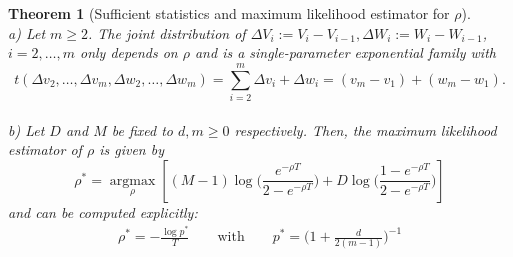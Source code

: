 \documentclass[preprint,authoryear]{elsarticle}
\newtheorem{theorem}{Theorem}
\theoremstyle{definition}
\numberwithin{equation}{section}
\numberwithin{figure}{section}
\begin{document}
\begin{theorem}[Sufficient statistics and maximum likelihood estimator for $\rho$\label{T:suff}]
  \quad \\ a) Let $m\geq 2$. The joint distribution of
  $\Delta V_i := V_i-V_{i-1}, \Delta W_i := W_i - W_{i-1}$,
  $i=2,\dots,m$ only depends on $\rho$ and is a single-parameter
  exponential family with
  $$ t(\Delta v_2,\dots,\Delta v_m, \Delta w_2,\dots,\Delta w_m) = 
  \sum_{i=2}^m \Delta v_i + \Delta w_i = (v_m-v_1) + (w_m-w_1).$$
  \\
  b)
  Let $D$ and $M$ be fixed to $d,m \geq 0$ respectively.
  Then, the maximum likelihood estimator of $\rho$ is given by 
  \begin{equation}\label{eq:totalprob2}
    \rho^\ast 
    = \mathop{argmax}\limits_{\rho} \left[(M-1)\log\bigg(\frac{e^{-\rho T}}{2-e^{-\rho T}} 
    \bigg) + D \log\bigg(\frac{1-e^{-\rho T}}{2 - e^{-\rho T}}
    \bigg)\right]
  \end{equation}
  and can be computed
explicitly:
  \begin{align}
    \label{eq:rhoast}
    \rho^\ast = -\frac{\log p^\ast}{T} \qquad \text{with}\qquad 
    p^\ast = \bigg(1 + \frac{d}{2(m-1)}\bigg)^{-1}
  \end{align}
\end{theorem}
\end{document}
